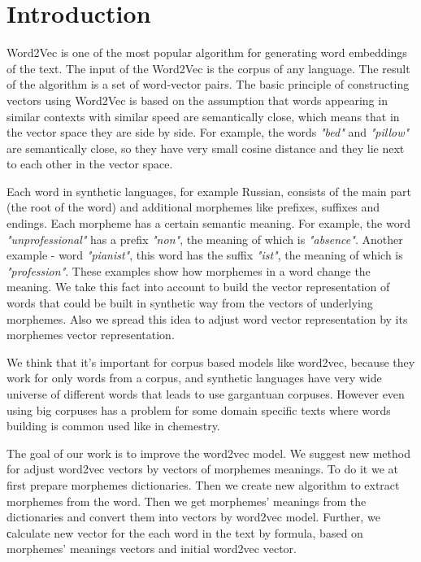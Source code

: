 \documentclass{svproc}
\begin{document}
\section{Introduction}

Word2Vec is one of the most popular algorithm for generating word embeddings of the text. The input of the Word2Vec is the corpus of any language. The result of the algorithm is a set of word-vector pairs. The basic principle of constructing vectors using Word2Vec is based on the assumption that words appearing in similar contexts with similar speed are semantically close, which means that in the vector space they are side by side. For example, the words \emph{"bed"} and \emph{"pillow"} are semantically close, so they have very small cosine distance and they lie next to each other in the vector space.

Each word in synthetic languages, for example Russian, consists of the main part (the root of the word) and additional morphemes like prefixes, suffixes and endings. Each morpheme has a certain semantic meaning. For example, the word \emph{"unprofessional"} has a prefix \emph{"non"}, the meaning of which is \emph{"absence"}. Another example - word \emph{"pianist"}, this word has the suffix \emph{"ist"}, the meaning of which is \emph{"profession"}. These examples show how morphemes in a word change the meaning. We take this fact into account to build the vector representation of words that could be built in synthetic way from the vectors of underlying morphemes. Also we spread this idea to adjust word vector representation by its morphemes vector representation. 

We think that it's important for corpus based models like word2vec, because they work for only words from a corpus, and synthetic languages have very wide universe of different words that leads to use gargantuan corpuses. However even using big corpuses has a problem for some domain specific texts where words building is common used like in chemestry.


The goal of our work is to improve the word2vec model. We suggest new method for adjust word2vec vectors by vectors of morphemes meanings. To do it we at first prepare morphemes dictionaries. Then we create new algorithm to extract morphemes from the word. Then we get morphemes' meanings from the dictionaries and convert them into vectors by word2vec model. Further, we сalculate new vector for the each word in the text by formula, based on morphemes' meanings vectors and initial word2vec vector.
\end{document}
